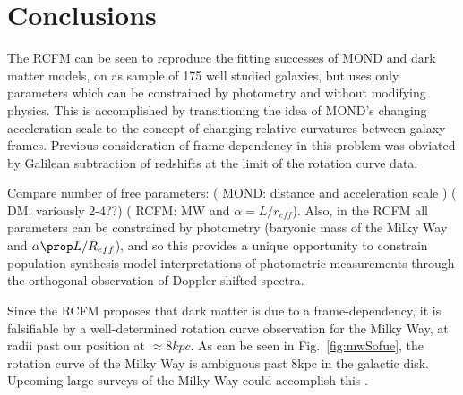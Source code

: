 \documentclass[reprint,%
 amsmath,amssymb,
 aps,
]{revtex4-1}
\begin{document}
 


 



 
 \section{  Conclusions \label{sec:conclu}  }
 




  
The RCFM can be seen  to reproduce the fitting successes of MOND and dark matter models,   on as  sample of   175  well studied galaxies\cite{2016Lelli},   but uses only parameters which can be constrained by photometry and without modifying physics.  This is accomplished by transitioning the idea of MOND's changing acceleration scale \cite{McGaugh2016RAR,2022A&A...664A..40M} to the concept of changing relative curvatures between galaxy frames. 
Previous consideration of frame-dependency in this problem was obviated by Galilean subtraction of redshifts at the limit of the rotation curve data\cite{Wald}.
 
Compare number of free parameters:    {\color{blue}(  MOND: distance and acceleration scale )}  {\color{blue}(  DM: variously 2-4??)} {\color{blue}( RCFM: MW and $\alpha = L/r_{eff} $)}.
Also, in the RCFM all    parameters can be constrained by photometry  (baryonic mass of the Milky Way and
$\alpha \prop L/R_{eff}$), and so this provides a unique opportunity to constrain population synthesis model interpretations of photometric measurements through the orthogonal observation of  Doppler shifted spectra. 
  
 
Since the  RCFM  proposes that dark matter is due to a frame-dependency, it is falsifiable by a well-determined rotation curve observation for the Milky Way,  at radii past our position at $\approx 8 kpc$.  As can be seen in Fig.~\ref{fig:mwSofue}, the rotation curve of the Milky Way  is ambiguous  past  $8$kpc  in 
  the galactic disk. Upcoming large surveys of the Milky Way  could accomplish this  \cite{Ivezić_2019,2022ApJS..259...35A,2010ApJ...716....1B,de_Blok_2010}. 
\end{document}
